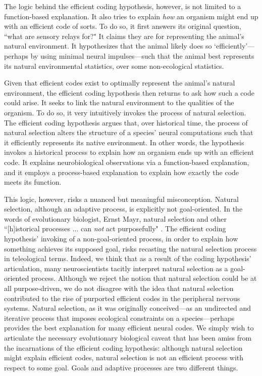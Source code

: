 \documentclass[twocolumn]{article}
\begin{document}
The logic behind the efficient coding hypothesis, however, is not limited to a function-based explanation. It also tries to explain \textit{how} an organism might end up with an efficient code of sorts. To do so, it first answers its original question, ``what are sensory relays for?" It claims they are for representing the animal's natural environment. It hypothesizes that the animal likely does so `efficiently'---perhaps by using minimal neural impulses---such that the animal best represents its natural environmental statistics, over some non-ecological statistics. 

Given that efficient codes exist to optimally represent the animal's natural environment, the efficient coding hypothesis then returns to ask how such a code could arise. It seeks to link the natural environment to the qualities of the organism. To do so, it very intuitively invokes the process of natural selection. The efficient coding hypothesis argues that, over historical time, the process of natural selection alters the structure of a species' neural computations such that it efficiently represents its native environment. In other words, the hypothesis invokes a historical process to explain how an organism ends up with an efficient code. It explains neurobiological observations via a function-based explanation, and it employs a process-based explanation to explain how exactly the code meets its function. 


This logic, however, risks a nuanced but meaningful misconception. Natural selection, although an adaptive process, is explicitly not goal-oriented. In the words of evolutionary biologist, Ernst Mayr, natural selection and other ``[h]istorical processes ... can \textit{not} act purposefully" \cite{mayr_1961}. The efficient coding hypothesis' invoking of a non-goal-oriented process, in order to explain how something achieves its supposed goal, risks recasting the natural selection process in teleological terms. Indeed, we think that as a result of the coding hypothesis' articulation, many neuroscientists tacitly interpret natural selection as a goal-oriented process. Although we reject the notion that natural selection could be at all purpose-driven, we do not disagree with the idea that natural selection contributed to the rise of purported efficient codes in the peripheral nervous systems. Natural selection, as it was originally conceived---as an undirected and iterative process that imposes ecological constraints on a species---perhaps provides the best explanation for many efficient neural codes. We simply wish to articulate the necessary evolutionary biological caveat that has been amiss from the incarnations of the efficient coding hypothesis: although natural selection might explain efficient codes, natural selection is not an efficient process with respect to some goal. Goals and adaptive processes are two different things.
\end{document}

